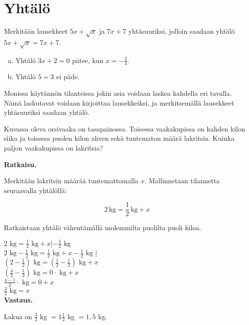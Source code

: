 \chapter{Yhtälö}


\begin{esimerkki}
Merkitään lausekkeet $5x+\sqrt{x}$ ja $7x+7$ yhtäsuuriksi, jolloin saadaan
yhtälö $5x+\sqrt{x} = 7x+7$.
\end{esimerkki}


\begin{esimerkki}
\begin{enumerate}[a)]
\item Yhtälö $3x + 2 = 0$ pätee, kun $x = - \frac{2}{3}$.
\item Yhtälö $5 = 3$ ei päde.
\end{enumerate}
\end{esimerkki}

Monissa käytännön tilanteissa jokin asia voidaan laskea kahdella eri tavalla.
Nämä laskutavat voidaan kirjoittaa lausekkeiksi, ja merkitsemällä lausekkeet yhtäsuuriksi saadaan yhtälö.

\begin{esimerkki}
Kuvassa oleva orsivaaka on tasapainossa. Toisessa vaakakupissa on kahden kilon siika ja toisessa puolen kilon ahven sekä tuntematon määrä lakritsia. Kuinka paljon vaakakupissa on lakritsia?

\textbf{Ratkaisu.}

Merkitään lakritsin määrää tuntemattomalla $x$. Mallinnetaan tilannetta seuraavalla yhtälöllä:

\begin{equation}
2\,\text{kg} = \frac{1}{2}\,\text{kg} + x
\end{equation}

Ratkaistaan yhtälö vähentämällä molemmilta puolilta puoli kiloa.

$2\text{ kg} = \frac{1}{2}\text{ kg} + x | -\frac{1}{2}\text{ kg}$ \\
$2\text{ kg} - \frac{1}{2}\text{ kg} = \frac{1}{2}\text{ kg} + x - \frac{1}{2}\text{ kg}$ |  \\
$(2-\frac{1}{2})\text{ kg} = (\frac{1}{2} - \frac{1}{2})\text{ kg} + x$ \\
$(\frac{4}{2} - \frac{1}{2})\text{ kg} = 0 \cdot \text{ kg} + x$ \\
$ \frac{4-1}{2} \cdot \text{ kg} = 0 + x$ \\
$ \frac{3}{2} \text{ kg} = x$ \\

\textbf{Vastaus.}

Lakua on $\frac{3}{2}$ kg $= 1 \frac{1}{2}$ kg $= 1,5$ kg.
\end{esimerkki}


